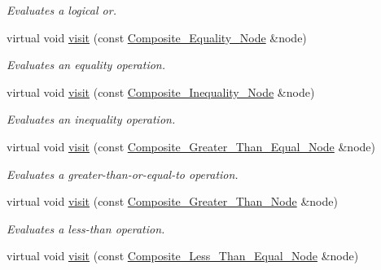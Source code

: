 \begin{DoxyCompactItemize}
\begin{DoxyCompactList}\small\item\em Evaluates a logical or. \item\end{DoxyCompactList}\item 
virtual void \hyperlink{classMadara_1_1Expression__Tree_1_1Evaluation__Visitor_a7383a967290101e03ba286ed59fc036e}{visit} (const \hyperlink{classMadara_1_1Expression__Tree_1_1Composite__Equality__Node}{Composite\_\-Equality\_\-Node} \&node)
\begin{DoxyCompactList}\small\item\em Evaluates an equality operation. \item\end{DoxyCompactList}\item 
virtual void \hyperlink{classMadara_1_1Expression__Tree_1_1Evaluation__Visitor_a8b428f77ff5392b1df72ace443789020}{visit} (const \hyperlink{classMadara_1_1Expression__Tree_1_1Composite__Inequality__Node}{Composite\_\-Inequality\_\-Node} \&node)
\begin{DoxyCompactList}\small\item\em Evaluates an inequality operation. \item\end{DoxyCompactList}\item 
virtual void \hyperlink{classMadara_1_1Expression__Tree_1_1Evaluation__Visitor_a2ad42bf7fc9bcaf73c608b01c96f08a0}{visit} (const \hyperlink{classMadara_1_1Expression__Tree_1_1Composite__Greater__Than__Equal__Node}{Composite\_\-Greater\_\-Than\_\-Equal\_\-Node} \&node)
\begin{DoxyCompactList}\small\item\em Evaluates a greater-\/than-\/or-\/equal-\/to operation. \item\end{DoxyCompactList}\item 
virtual void \hyperlink{classMadara_1_1Expression__Tree_1_1Evaluation__Visitor_ad6d5516b88d0c701c8a836a538aee93a}{visit} (const \hyperlink{classMadara_1_1Expression__Tree_1_1Composite__Greater__Than__Node}{Composite\_\-Greater\_\-Than\_\-Node} \&node)
\begin{DoxyCompactList}\small\item\em Evaluates a less-\/than operation. \item\end{DoxyCompactList}\item 
virtual void \hyperlink{classMadara_1_1Expression__Tree_1_1Evaluation__Visitor_a2b8c077eb7edeb4b967aeb28b81a3483}{visit} (const \hyperlink{classMadara_1_1Expression__Tree_1_1Composite__Less__Than__Equal__Node}{Composite\_\-Less\_\-Than\_\-Equal\_\-Node} \&node)

\end{DoxyCompactItemize}

